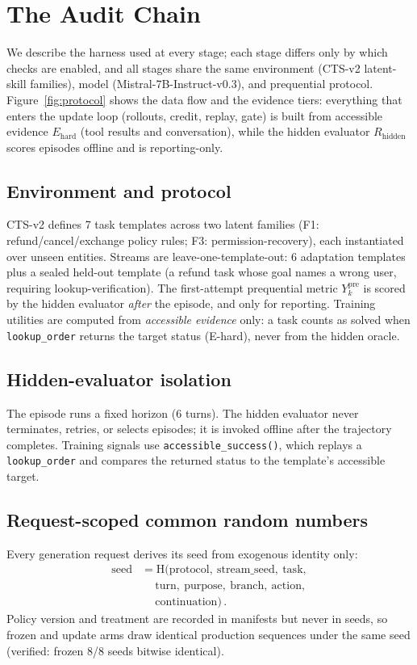\section{The Audit Chain}

We describe the harness used at every stage; each stage differs only by
which checks are enabled, and all stages share the same environment
(CTS-v2 latent-skill families), model (Mistral-7B-Instruct-v0.3), and
prequential protocol. Figure~\ref{fig:protocol} shows the data flow and
the evidence tiers: everything that enters the update loop (rollouts,
credit, replay, gate) is built from accessible evidence $E_{\mathrm{hard}}$
(tool results and conversation), while the hidden evaluator $R_{\mathrm{hidden}}$
scores episodes offline and is reporting-only.

\subsection{Environment and protocol}
CTS-v2 defines 7 task templates across two latent families (F1:
refund/cancel/exchange policy rules; F3: permission-recovery), each
instantiated over unseen entities. Streams are leave-one-template-out:
6 adaptation templates plus a sealed held-out template (a refund task
whose goal names a wrong user, requiring lookup-verification). The
first-attempt prequential metric $Y^{\mathrm{pre}}_k$ is scored by the
hidden evaluator \emph{after} the episode, and only for reporting.
Training utilities are computed from \emph{accessible evidence} only:
a task counts as solved when \texttt{lookup\_order} returns the
target status (E-hard), never from the hidden oracle.

\subsection{Hidden-evaluator isolation}
The episode runs a fixed horizon (6 turns). The hidden evaluator never
terminates, retries, or selects episodes; it is invoked offline after
the trajectory completes. Training signals use
\texttt{accessible\_success()}, which replays a \texttt{lookup\_order}
and compares the returned status to the template's accessible target.

\subsection{Request-scoped common random numbers}
Every generation request derives its seed from exogenous identity
only:
\[
  \begin{aligned}
    \mathrm{seed} &= \mathrm{H}(\mathrm{protocol},\ \mathrm{stream\_seed},\ \mathrm{task},\\
    &\quad\ \mathrm{turn},\ \mathrm{purpose},\ \mathrm{branch},\ \mathrm{action},\\
    &\quad\ \mathrm{continuation})\,.
  \end{aligned}
\]
Policy version and treatment are recorded in manifests but never in
seeds, so frozen and update arms draw identical production sequences
under the same seed (verified: frozen 8/8 seeds bitwise identical).

